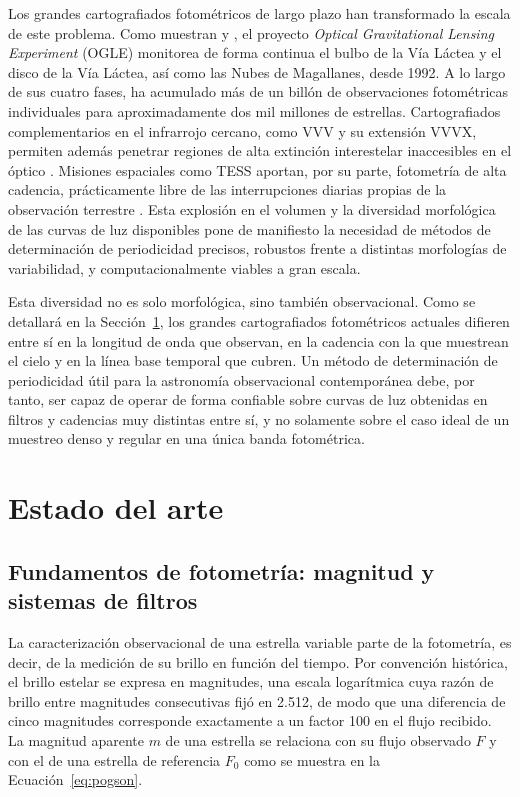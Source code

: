 \documentclass[12pt,letterpaper,oneside]{book}
\begin{document}
Los grandes cartografiados fotom\'etricos de largo plazo han transformado la escala de este problema. Como muestran \citet{iwanek_2025} y \citet{soszynski_2024}, el proyecto \emph{Optical Gravitational Lensing Experiment} (OGLE) monitorea de forma continua el bulbo de la V\'ia L\'actea y el disco de la V\'ia L\'actea, as\'i como las Nubes de Magallanes, desde 1992. A lo largo de sus cuatro fases, ha acumulado m\'as de un bill\'on de observaciones fotom\'etricas individuales para aproximadamente dos mil millones de estrellas. Cartografiados complementarios en el infrarrojo cercano, como VVV y su extensi\'on VVVX, permiten adem\'as penetrar regiones de alta extinci\'on interestelar inaccesibles en el \'optico \citep{vvv_survey,saito_2024}. Misiones espaciales como TESS aportan, por su parte, fotometr\'ia de alta cadencia, pr\'acticamente libre de las interrupciones diarias propias de la observaci\'on terrestre \citep{ricker_2015}. Esta explosi\'on en el volumen y la diversidad morfol\'ogica de las curvas de luz disponibles pone de manifiesto la necesidad de m\'etodos de determinaci\'on de periodicidad precisos, robustos frente a distintas morfolog\'ias de variabilidad, y computacionalmente viables a gran escala.

Esta diversidad no es solo morfol\'ogica, sino tambi\'en observacional. Como se detallar\'a en la Secci\'on~\ref{sec:estado-del-arte}, los grandes cartografiados fotom\'etricos actuales difieren entre s\'i en la longitud de onda que observan, en la cadencia con la que muestrean el cielo y en la l\'inea base temporal que cubren. Un m\'etodo de determinaci\'on de periodicidad \'util para la astronom\'ia observacional contempor\'anea debe, por tanto, ser capaz de operar de forma confiable sobre curvas de luz obtenidas en filtros y cadencias muy distintas entre s\'i, y no solamente sobre el caso ideal de un muestreo denso y regular en una \'unica banda fotom\'etrica.

\section{Estado del arte}
\label{sec:estado-del-arte}

\subsection{Fundamentos de fotometr\'ia: magnitud y sistemas de filtros}

La caracterizaci\'on observacional de una estrella variable parte de la fotometr\'ia, es decir, de la medici\'on de su brillo en funci\'on del tiempo. Por convenci\'on hist\'orica, el brillo estelar se expresa en magnitudes, una escala logar\'itmica cuya raz\'on de brillo entre magnitudes consecutivas fij\'o \citet{Pogson1856} en 2.512, de modo que una diferencia de cinco magnitudes corresponde exactamente a un factor 100 en el flujo recibido. La magnitud aparente $m$ de una estrella se relaciona con su flujo observado $F$ y con el de una estrella de referencia $F_0$ como se muestra en la Ecuaci\'on~\eqref{eq:pogson}.
\end{document}
